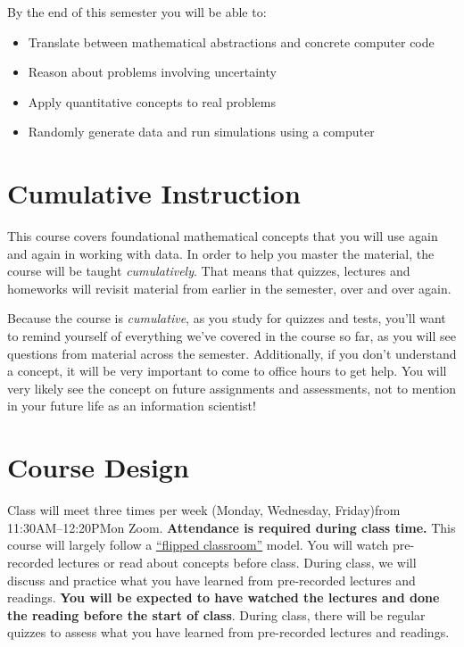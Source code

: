 \documentclass[10pt]{memoir}
\def\mymeetingdays{Monday, Wednesday, Friday}
\def\mymeetingtimes{11:30AM--12:20PM}
\begin{document}
By the end of this semester you will be able to:
\begin{itemize}
\item Translate between mathematical abstractions and concrete computer code
\item Reason about problems involving uncertainty
\item Apply quantitative concepts to real problems
\item Randomly generate data and run simulations using a computer
\end{itemize}

\section{\textbf{Cumulative Instruction}}

This course covers foundational mathematical concepts that you will use again and again in working with data. In order to help you master the material, the course will be taught \textit{cumulatively}. That means that quizzes, lectures and homeworks will revisit material from earlier in the semester, over and over again. 

Because the course is \textit{cumulative}, as you study for quizzes and tests, you'll want to remind yourself of everything we've covered in the course so far, as you will see questions from material across the semester. Additionally, if you don't understand a concept, it will be very important to come to office hours to get help. You will very likely see the concept on future assignments and assessments, not to mention in your future life as an information scientist!

\section{\textbf{Course Design}}
Class will meet three times per week (\mymeetingdays)\space from \mymeetingtimes\space on Zoom. \textbf{Attendance is required during class time.}  This course will largely follow a \href{https://en.wikipedia.org/wiki/Flipped_classroom}{``flipped classroom''}  model. You will watch pre-recorded lectures or read about concepts before class. During class, we will discuss and practice what you have learned from pre-recorded lectures and readings. \textbf{You will be expected to have watched the lectures and done the reading before the start of class}. During class, there will be regular quizzes to assess what you have learned from pre-recorded lectures and readings. 
\end{document}
